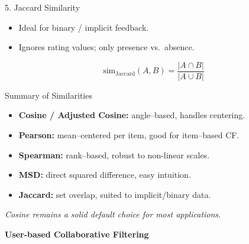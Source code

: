 \documentclass{beamer}
\begin{document}
\begin{frame}{5. Jaccard Similarity}
\begin{itemize}
  \item Ideal for binary / implicit feedback.
  \item Ignores rating values; only presence vs.\ absence.
\end{itemize}
\[
\text{sim}_{\mathrm{Jaccard}}(A,B)
= \frac{\lvert A \cap B\rvert}{\lvert A \cup B\rvert}
\]
\bigskip
\begin{center}
\end{center}
\end{frame}

\begin{frame}{Summary of Similarities}
\begin{itemize}
  \item \textbf{Cosine / Adjusted Cosine:} angle–based, handles centering.
  \item \textbf{Pearson:} mean–centered per item, good for item–based CF.
  \item \textbf{Spearman:} rank–based, robust to non-linear scales.
  \item \textbf{MSD:} direct squared difference, easy intuition.
  \item \textbf{Jaccard:} set overlap, suited to implicit/binary data.
\end{itemize}
\begin{center}
  \emph{Cosine remains a solid default choice for most applications.}
\end{center}
\end{frame}

\begin{frame}[plain]
    \begin{center}
        {\LARGE \textbf{User-based Collaborative Filtering}}
    \end{center}
\end{frame}
\end{document}
